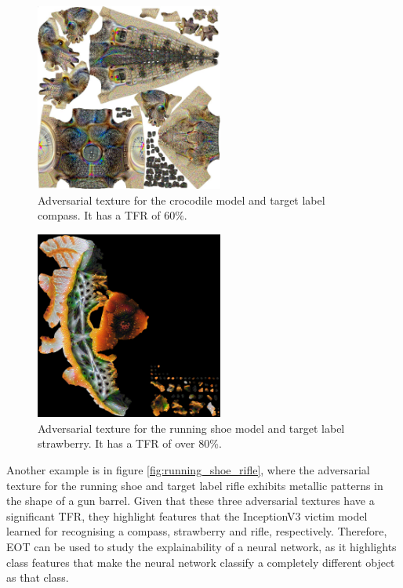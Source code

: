 \begin{figure}[H]
    \centering
    \includegraphics[width=0.55\textwidth]{graphics/crocodile compass.jpg}
    \caption[Adversarial texture for the crocodile model and target label compass.]{Adversarial texture for the crocodile model and target label compass. It has a TFR of 60\%.}
    \label{fig:crocodile_compass}
\end{figure}

\begin{figure}[H]
    \centering
    \includegraphics[width=0.55\textwidth]{graphics/running shoe strawberry.jpg}
    \caption[Adversarial texture for the running shoe model and target label strawberry.]{Adversarial texture for the running shoe model and target label strawberry. It has a TFR of over 80\%.}
    \label{fig:running_shoe_strawberry}
\end{figure}

Another example is in figure \ref{fig:running_shoe_rifle}, where the adversarial texture for the running shoe and target label rifle exhibits metallic patterns in the shape of a gun barrel. Given that these three adversarial textures have a significant TFR, they highlight features that the InceptionV3 victim model learned for recognising a compass, strawberry and rifle, respectively. Therefore, EOT can be used to study the explainability of a neural network, as it highlights class features that make the neural network classify a completely different object as that class.

